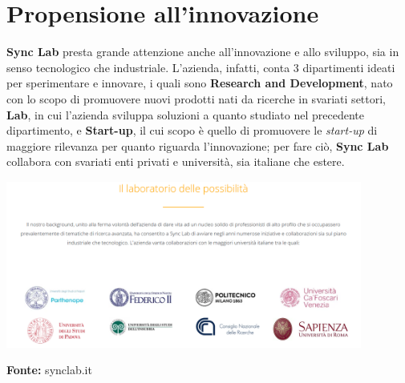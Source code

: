 
\section{Propensione all'innovazione}

\textbf{Sync Lab} presta grande attenzione anche all'innovazione e allo sviluppo, sia in senso tecnologico che industriale. L'azienda, infatti, conta 3 dipartimenti ideati per sperimentare e innovare, i quali sono \textbf{Research and Development}, nato con lo scopo di promuovere nuovi prodotti nati da ricerche in svariati settori, \textbf{Lab}, in cui l'azienda sviluppa soluzioni a quanto studiato nel precedente dipartimento, e \textbf{Start-up}, il cui scopo è quello di promuovere le \textit{start-up} di maggiore rilevanza per quanto riguarda l'innovazione; per fare ciò, \textbf{Sync Lab} collabora con svariati enti privati e università, sia italiane che estere.

\begin{minipage}{\linewidth}
  \centering
    \includegraphics[height=5.5cm]{immagini/universita}
  \caption*{\textbf{Fonte:} synclab.it}
\end{minipage}


